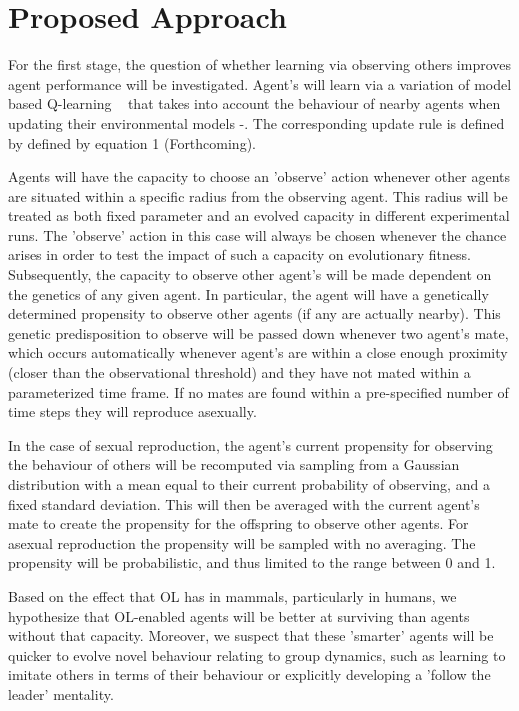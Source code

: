 \documentclass[letterpaper]{article}
\numberwithin{equation}{section}
\numberwithin{theorem}{section}
\numberwithin{lemma}{section}
\numberwithin{df}{section}
\begin{document}
\section{Proposed Approach}
For the first stage, the question of whether learning via observing others improves agent performance will be investigated. 
Agent's will learn via a variation of model based Q-learning ~\cite{sutton1990integrated} that takes into account the behaviour of 
nearby agents when updating their environmental models  -\cite{price2003accelerating}. The corresponding update rule is defined by defined by equation 1 (Forthcoming).


Agents will have the capacity to choose an 'observe' action whenever other agents are situated within a specific radius from the observing agent. 
This radius will be treated as both fixed parameter and an evolved capacity in different experimental runs.
The 'observe' action in this case will always be chosen whenever the chance arises in order to test the impact of such a capacity on evolutionary fitness.
Subsequently, the capacity to observe other agent's will be made dependent on the genetics of any given agent. In particular, the agent will have a genetically determined propensity to observe other agents (if any are actually nearby). This genetic predisposition to observe will be passed down whenever two agent's mate, which occurs automatically whenever agent's are within a close enough proximity (closer than the observational threshold) and they have not mated within a parameterized time frame. If no mates are found within a pre-specified number of time steps they will reproduce asexually. 

In the case of sexual reproduction, the agent's current propensity for observing the behaviour of others will be recomputed via sampling from a Gaussian distribution with a mean equal to their current probability of observing, and a fixed standard deviation. This will then be averaged with the current agent's mate to create the propensity for the offspring to observe other agents.
For asexual reproduction the propensity will be sampled with no averaging. The propensity will be probabilistic, and thus limited to the range between 0 and 1.

Based on the effect that OL has in mammals, particularly in humans, we hypothesize that OL-enabled agents will be better at surviving than agents without that capacity. Moreover, we suspect that these 'smarter' agents will be quicker to evolve novel behaviour relating to group dynamics, such as learning to imitate others in terms of their behaviour or explicitly developing a 'follow the leader' mentality.
\end{document}
